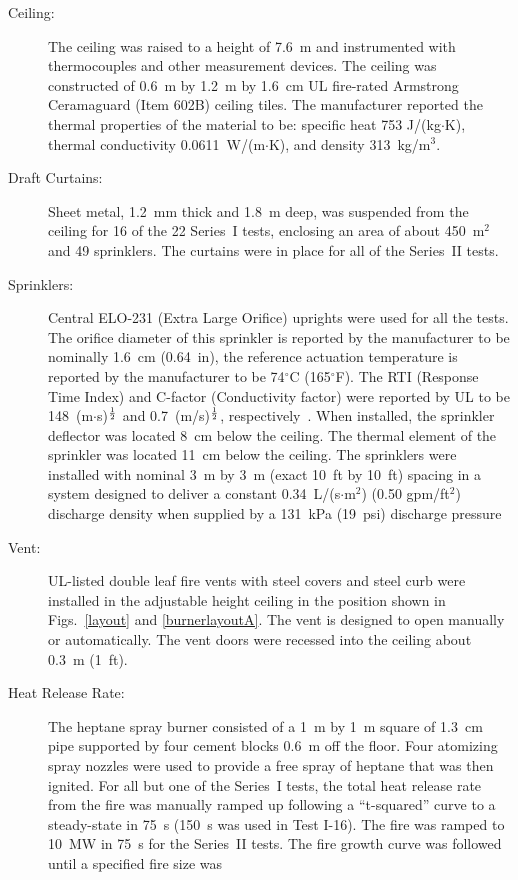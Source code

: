 \begin{description}
\item[Ceiling:] The ceiling was raised to a height of 7.6~m and instrumented with thermocouples and other measurement devices. The ceiling was constructed of
0.6~m by 1.2~m by 1.6~cm UL fire-rated Armstrong Ceramaguard (Item 602B) ceiling tiles. The manufacturer reported the
thermal properties of the material to be: specific heat 753 J/(kg$\cdot$K), thermal conductivity
0.0611~W/(m$\cdot$K), and density 313~kg/m$^3$.
\item[Draft Curtains:] Sheet metal, 1.2~mm thick and 1.8~m deep, was suspended from the ceiling for 16 of the 22 Series~I tests, enclosing an area of about 450~m$^2$ and 49 sprinklers.
The curtains were in place for all of the Series~II tests.
\item[Sprinklers:] Central ELO-231 (Extra Large Orifice) uprights were used for all the tests. The orifice diameter of this sprinkler is reported by the manufacturer to be
nominally 1.6~cm (0.64~in), the reference actuation temperature is reported by the manufacturer to be 74$^\circ$C (165$^\circ$F). The RTI (Response Time
Index) and C-factor (Conductivity factor) were reported by UL to be 148~(m$\cdot$s)$^{\frac{1}{2}}$ and 0.7~(m/s)$^{\frac{1}{2}}$, respectively~\cite{Sheppard:1}.
When installed, the sprinkler deflector was located 8~cm below the ceiling. The thermal
element of the sprinkler was located 11~cm below the ceiling. The sprinklers were installed with nominal 3~m by 3~m (exact 10~ft by 10~ft) spacing in a
system designed to deliver a constant 0.34~L/(s$\cdot$m$^2$) (0.50 gpm/ft$^2$) discharge density when supplied by a 131~kPa (19~psi) discharge
pressure
\item[Vent:] UL-listed double leaf fire vents with steel covers and steel curb were installed in the adjustable height ceiling in the position shown in
Figs.~\ref{layout} and \ref{burnerlayoutA}. The vent is designed to open manually or automatically. The vent doors were recessed into the ceiling about 0.3~m (1~ft).
\item[Heat Release Rate:] The heptane spray burner consisted of a 1~m by 1~m square of 1.3~cm pipe supported by four cement blocks 0.6~m off the floor.
Four atomizing spray nozzles were used to provide a free spray of heptane that was then ignited. For all but one of the Series~I tests, the total heat release
rate from the fire was manually ramped up following a ``t-squared'' curve to a steady-state in 75~s
(150~s was used in Test I-16). The fire was ramped to 10~MW in 75~s for the Series~II tests. The fire growth curve was followed until a specified fire size was

\end{description}

